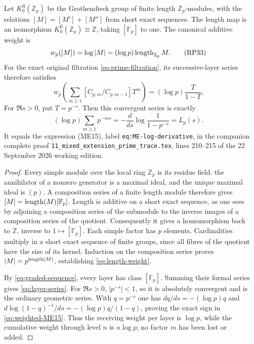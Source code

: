 \begin{theorem}
\label{thm:weighted-filtration}
Let $K_0^{\mathrm{fl}}(\mathbb Z_p)$ be the Grothendieck group of finite
length $\mathbb Z_p$-modules, with the relations
$[M]=[M']+[M'']$ from short exact sequences. The length map is an
isomorphism $K_0^{\mathrm{fl}}(\mathbb Z_p)\cong\mathbb Z$, taking
$[\mathbb F_p]$ to one. The canonical additive weight is
\[
 w_p([M])=\log|M|=(\log p)\operatorname{length}_{\mathbb Z_p}M.
 \tag{RP33}\label{eq:length-weight}
\]
For the exact original filtration \eqref{eq:prime-filtration}, its
successive-layer series therefore satisfies
\[
 w_p\left(\sum_{m\ge1}[C_{p,m}/C_{p,m-1}]T^m\right)
   =(\log p)\frac{T}{1-T}.
 \tag{RP34}\label{eq:layer-series}
\]
For $\Re s>0$, put $T=p^{-s}$. Then this convergent series is exactly
\[
 (\log p)\sum_{m\ge1}p^{-ms}
 =-\frac{d}{ds}\log\frac1{1-p^{-s}}=L_p(s).
 \tag{RP35}\label{eq:weighted-ME15}
\]
It equals the expression (ME15), label
\texttt{eq:ME-log-derivative}, in the companion complete proof
\texttt{11\_mixed\_extension\_prime\_trace.tex}, lines 210--215 of
the 22 September 2026 working edition.
\end{theorem}
\begin{proof}
Every simple module over the local ring $\mathbb Z_p$ is its residue
field: the annihilator of a nonzero generator is a maximal ideal,
and the unique maximal ideal is $(p)$. A composition series of a
finite length module therefore gives $[M]=\operatorname{length}(M)[\mathbb F_p]$.
Length is additive on a short exact sequence, as one sees by adjoining
a composition series of the submodule to the inverse images of a
composition series of the quotient. Consequently it gives a homomorphism
back to $\mathbb Z$, inverse to $1\mapsto[\mathbb F_p]$.
Each simple factor has $p$ elements. Cardinalities multiply in a short
exact sequence of finite groups, since all fibres of the quotient
have the size of its kernel. Induction on the composition series
proves $|M|=p^{\operatorname{length}(M)}$, establishing \eqref{eq:length-weight}.

By \eqref{eq:graded-sequence}, every layer has class $[\mathbb F_p]$.
Summing their formal series gives \eqref{eq:layer-series}. For
$\Re s>0$, $|p^{-s}|<1$, so it is absolutely convergent and is the
ordinary geometric series. With $q=p^{-s}$ one has
$dq/ds=-(\log p)q$ and
$d\log(1-q)^{-1}/ds=-(\log p)q/(1-q)$, proving the exact sign in
\eqref{eq:weighted-ME15}. Thus the receiving weight per layer is
$\log p$, while the cumulative weight through level $n$ is
$n\log p$; no factor $m$ has been lost or added.
\end{proof}

